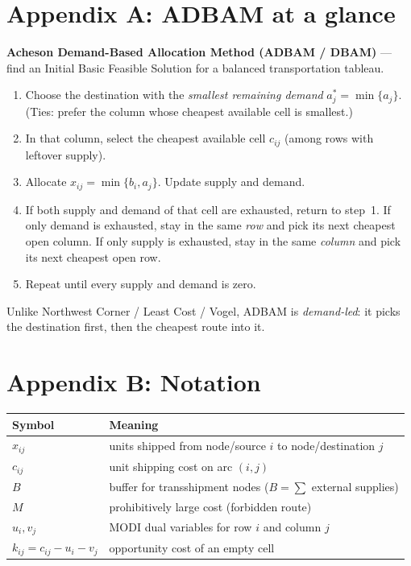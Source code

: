 \documentclass[11pt,a4paper]{article}
\begin{document}
\section*{Appendix A: ADBAM at a glance}
\begin{algobox}
\textbf{Acheson Demand-Based Allocation Method (ADBAM / DBAM)}
--- find an Initial Basic Feasible Solution for a balanced transportation tableau.

\begin{enumerate}
  \item Choose the destination with the \emph{smallest remaining demand}
        \(a_j^*=\min\{a_j\}\). (Ties: prefer the column whose cheapest available cell is smallest.)
  \item In that column, select the cheapest available cell \(c_{ij}\) (among rows with leftover supply).
  \item Allocate \(x_{ij}=\min\{b_i,a_j\}\). Update supply and demand.
  \item If both supply and demand of that cell are exhausted, return to step~1.
        If only demand is exhausted, stay in the same \emph{row} and pick its next cheapest open column.
        If only supply is exhausted, stay in the same \emph{column} and pick its next cheapest open row.
  \item Repeat until every supply and demand is zero.
\end{enumerate}
Unlike Northwest Corner / Least Cost / Vogel, ADBAM is \emph{demand-led}: it
picks the destination first, then the cheapest route into it.
\end{algobox}

\section*{Appendix B: Notation}
\begin{center}
\begin{tabular}{@{}ll@{}}
\toprule
Symbol & Meaning \\
\midrule
\(x_{ij}\) & units shipped from node/source \(i\) to node/destination \(j\) \\
\(c_{ij}\) & unit shipping cost on arc \((i,j)\) \\
\(B\) & buffer for transshipment nodes (\(B=\sum\) external supplies) \\
\(M\) & prohibitively large cost (forbidden route) \\
\(u_i,v_j\) & MODI dual variables for row \(i\) and column \(j\) \\
\(k_{ij}=c_{ij}-u_i-v_j\) & opportunity cost of an empty cell \\
\bottomrule
\end{tabular}
\end{center}
\end{document}
